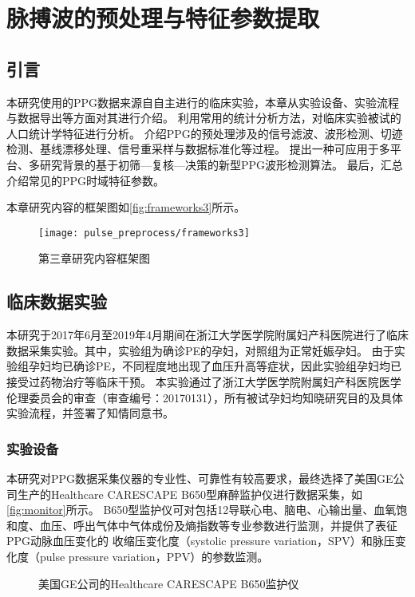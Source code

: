 \chapter{脉搏波的预处理与特征参数提取}
\section{引言}
本研究使用的PPG数据来源自自主进行的临床实验，本章从实验设备、实验流程与数据导出等方面对其进行介绍。
利用常用的统计分析方法，对临床实验被试的人口统计学特征进行分析。
介绍PPG的预处理涉及的信号滤波、波形检测、切迹检测、基线漂移处理、信号重采样与数据标准化等过程。
提出一种可应用于多平台、多研究背景的基于初筛—复核—决策的新型PPG波形检测算法。
最后，汇总介绍常见的PPG时域特征参数。

本章研究内容的框架图如\autoref{fig:frameworks3}所示。

\begin{figure}[htbp]
    \centering
    \texttt{[image: pulse\_preprocess/frameworks3]}
    \caption{\label{fig:frameworks3}第三章研究内容框架图}
\end{figure}
\section{临床数据实验}
本研究于2017年6月至2019年4月期间在浙江大学医学院附属妇产科医院进行了临床数据采集实验。其中，实验组为确诊PE的孕妇，对照组为正常妊娠孕妇。
由于实验组孕妇均已确诊PE，不同程度地出现了血压升高等症状，因此实验组孕妇均已接受过药物治疗等临床干预。
本实验通过了浙江大学医学院附属妇产科医院医学伦理委员会的审查（审查编号：20170131），所有被试孕妇均知晓研究目的及具体实验流程，并签署了知情同意书。

\subsection{实验设备}
本研究对PPG数据采集仪器的专业性、可靠性有较高要求，最终选择了美国GE公司生产的Healthcare CARESCAPE B650型麻醉监护仪进行数据采集，如\autoref{fig:monitor}所示。
B650型监护仪可对包括12导联心电、脑电、心输出量、血氧饱和度、血压、呼出气体中气体成份及熵指数等专业参数进行监测，并提供了表征PPG动脉血压变化的
收缩压变化度（systolic pressure variation，SPV）和脉压变化度（pulse pressure variation，PPV）的参数监测\cite{GE2021,Michard1999}。
\begin{figure}[htbp]
    \centering
    \quad
    \caption{\label{fig:monitor}美国GE公司的Healthcare CARESCAPE B650监护仪}
\end{figure}

